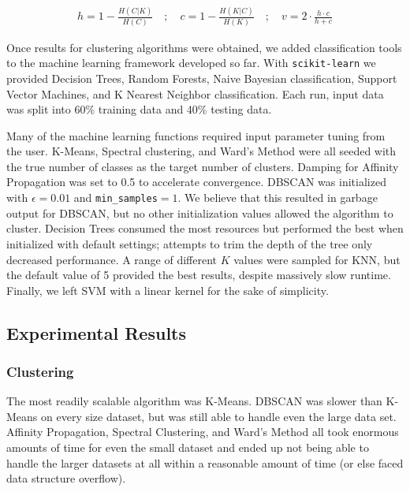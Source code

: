 \documentclass[letterpaper,10pt]{article}
\begin{document}
\begin{align}
h = 1 - \frac{H(C|K)}{H(C)}\quad;\quad
c = 1 - \frac{H(K|C)}{H(K)}\quad;\quad
v = 2 \cdot \frac{h \cdot c}{h + c}
\label{eq:vmeasure}
\end{align}


Once results for clustering algorithms were obtained, we added
classification tools to the machine learning framework developed so far.
With \texttt{scikit-learn} we provided Decision Trees, Random Forests,
Naive Bayesian classification, Support Vector Machines, and K Nearest
Neighbor classification. Each run, input data was split into 60\% training
data and 40\% testing data.


Many of the machine learning functions required input parameter tuning from
the user. K-Means, Spectral clustering, and Ward's Method were all seeded
with the true number of classes as the target number of clusters. Damping
for Affinity Propagation was set to 0.5 to accelerate convergence. DBSCAN
was initialized with $\epsilon=0.01$ and \texttt{min\_samples}$=1$. We
believe that this resulted in garbage output for DBSCAN, but no other
initialization values allowed the algorithm to cluster. Decision Trees
consumed the most resources but performed the best when initialized with
default settings; attempts to trim the depth of the tree only decreased
performance. A range of different $K$ values were sampled for KNN, but the
default value of 5 provided the best results, despite massively slow
runtime. Finally, we left SVM with a linear kernel for the sake of
simplicity.


\subsection{Experimental Results}

\subsubsection{Clustering}

The most readily scalable algorithm was K-Means. DBSCAN was slower than
K-Means on every size dataset, but was still able to handle even the large
data set. Affinity Propagation, Spectral Clustering, and Ward's Method all
took enormous amounts of time for even the small dataset and ended up not
being able to handle the larger datasets at all within a reasonable amount
of time (or else faced data structure overflow).
\end{document}
